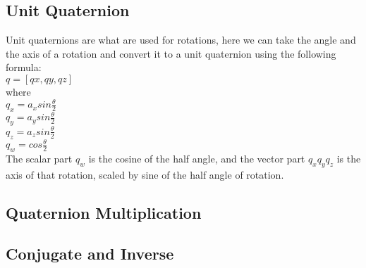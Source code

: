 \subsection{Unit Quaternion}
Unit quaternions are what are used for rotations, here we can take the angle and the axis of a rotation and convert it to a unit quaternion using the following formula: \\
$q = [qx, qy, qz]$\\
where\\
$q_x = a_x sin \frac{\theta}{2}$\\
$q_y = a_y sin \frac{\theta}{2}$\\
$q_z = a_z sin \frac{\theta}{2}$\\
$q_w = cos \frac{\theta}{2}$\\
The scalar part $q_w$ is the cosine of the half angle, and the vector part $q_x q_y q_z$ is the axis of that rotation, scaled by sine of the half angle of rotation.  

\subsection{Quaternion Multiplication}

\subsection{Conjugate and Inverse}